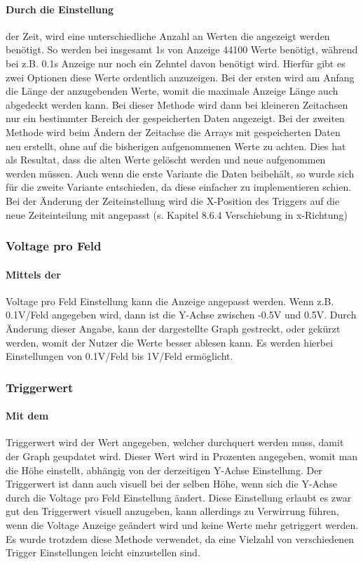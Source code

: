 \documentclass{article}
\begin{document}
\paragraph{Durch die Einstellung}
der Zeit, wird eine unterschiedliche Anzahl an Werten die angezeigt werden benötigt. So werden bei insgesamt 1s von Anzeige 44100 Werte benötigt, während bei z.B. 0.1s Anzeige nur noch ein Zehntel davon benötigt wird. Hierfür gibt es zwei Optionen diese Werte ordentlich anzuzeigen. Bei der ersten wird am Anfang die Länge der anzugebenden Werte, womit die maximale Anzeige Länge auch abgedeckt werden kann. Bei dieser Methode wird dann bei kleineren Zeitachsen nur ein bestimmter Bereich der gespeicherten Daten angezeigt. Bei der zweiten Methode wird beim Ändern der Zeitachse die Arrays mit gespeicherten Daten neu erstellt, ohne auf die bisherigen aufgenommenen Werte zu achten. Dies hat als Resultat, dass die alten Werte gelöscht werden und neue aufgenommen werden müssen. Auch wenn die erste Variante die Daten beibehält, so wurde sich für die zweite Variante entschieden, da diese einfacher zu implementieren schien. Bei der
Änderung der Zeiteinstellung wird die X-Position des Triggers auf die neue Zeiteinteilung mit angepasst (s. Kapitel 8.6.4 Verschiebung in x-Richtung)

\subsubsection{Voltage pro Feld}
\paragraph{Mittels der}
Voltage pro Feld Einstellung kann die Anzeige angepasst werden. Wenn z.B. 0.1V/Feld angegeben wird, dann ist die Y-Achse zwischen -0.5V und 0.5V. Durch Änderung dieser Angabe, kann der dargestellte Graph gestreckt, oder gekürzt werden, womit der Nutzer die Werte besser ablesen kann. Es werden hierbei Einstellungen von 0.1V/Feld bis 1V/Feld ermöglicht. 

\subsubsection{Triggerwert}
\paragraph{Mit dem}
Triggerwert wird der Wert angegeben, welcher durchquert werden muss, damit der Graph geupdatet wird. Dieser Wert wird in Prozenten angegeben, womit man die Höhe einstellt, abhängig von der derzeitigen Y-Achse Einstellung. Der Triggerwert ist dann auch visuell bei der selben Höhe, wenn sich die Y-Achse durch die Voltage pro Feld Einstellung ändert. Diese Einstellung erlaubt es zwar gut den Triggerwert visuell anzugeben, kann allerdings zu Verwirrung führen, wenn die Voltage Anzeige geändert wird und keine Werte mehr getriggert werden. Es wurde trotzdem diese Methode verwendet, da eine Vielzahl von verschiedenen Trigger Einstellungen leicht einzustellen sind.
\end{document}

